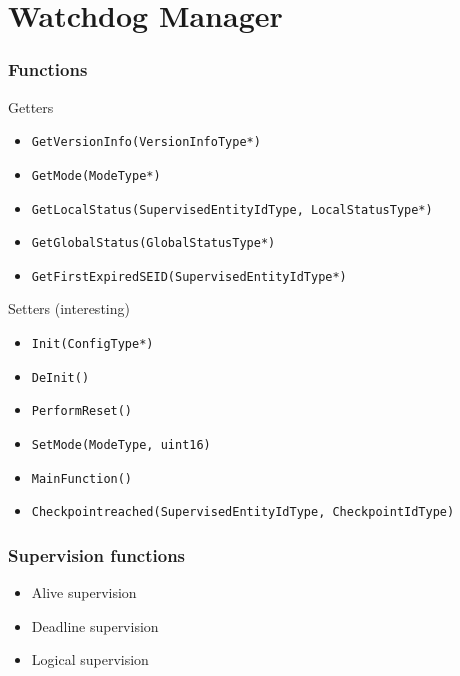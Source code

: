 \documentclass{beamer}
\begin{document}
\section{Watchdog Manager}
\begin{frame}[fragile]
  \frametitle{Functions}
  \begin{block}{Getters}
    \begin{itemize}
      \item \lstinline!GetVersionInfo(VersionInfoType*)!
      \item \lstinline!GetMode(ModeType*)!
      \item \lstinline!GetLocalStatus(SupervisedEntityIdType, LocalStatusType*)!
      \item \lstinline!GetGlobalStatus(GlobalStatusType*)!
      \item \lstinline!GetFirstExpiredSEID(SupervisedEntityIdType*)!
    \end{itemize}
  \end{block}

  \begin{block}{Setters (interesting)}
    \begin{itemize}
      \item \lstinline!Init(ConfigType*)!
      \item \lstinline!DeInit()!
      \item \lstinline!PerformReset()!
      \item \lstinline!SetMode(ModeType, uint16)!
      \item \lstinline!MainFunction()!
      \item \lstinline!Checkpointreached(SupervisedEntityIdType, CheckpointIdType)!
    \end{itemize}
  \end{block}
\end{frame}

\begin{frame}
  \frametitle{Supervision functions}
  \begin{itemize}
    \item Alive supervision
    \item Deadline supervision
    \item Logical supervision
  \end{itemize}
\end{frame}

\end{document}
